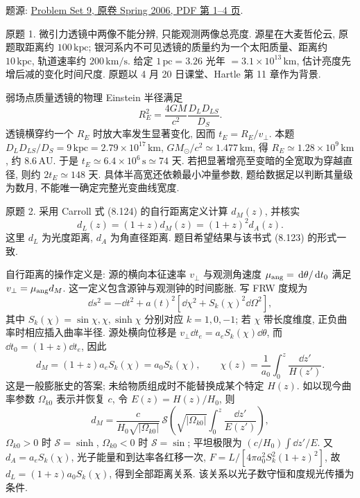 题源: \href{https://ocw.mit.edu/courses/8-962-general-relativity-spring-2020/resources/mit8_962s20_pset09/}{Problem Set 9, 原卷 Spring 2006, PDF 第 1--4 页}.

\begin{exercise}\label{ps:9.1}
原题 1. 微引力透镜中两像不能分辨, 只能观测两像总亮度. 源星在大麦哲伦云, 原题取距离约 $100\,\mathrm{kpc}$; 银河系内不可见透镜的质量约为一个太阳质量、距离约 $10\,\mathrm{kpc}$, 轨道速率约 $200\,\mathrm{km/s}$. 给定 $1\,\mathrm{pc}=3.26$ 光年 $=3.1\times10^{13}\,\mathrm{km}$, 估计亮度先增后减的变化时间尺度. 原题以 4 月 20 日课堂、Hartle 第 11 章作为背景.
\end{exercise}
\begin{solution}
弱场点质量透镜的物理 Einstein 半径满足
\[
R_E^2=\frac{4GM}{c^2}\frac{D_LD_{LS}}{D_S}.
\]
透镜横穿约一个 $R_E$ 时放大率发生显著变化, 因而 $t_E=R_E/v_\perp$. 本题 $D_LD_{LS}/D_S=9\,\mathrm{kpc}=2.79\times10^{17}\,\mathrm{km}$, $GM_\odot/c^2\simeq1.477\,\mathrm{km}$, 得 $R_E\simeq1.28\times10^9\,\mathrm{km}$, 约 $8.6\,\mathrm{AU}$. 于是 $t_E\simeq6.4\times10^6\,\mathrm{s}\simeq74$ 天. 若把显著增亮至变暗的全宽取为穿越直径, 则约 $2t_E\simeq148$ 天. 具体半高宽还依赖最小冲量参数, 题给数据足以判断其量级为数月, 不能唯一确定完整光变曲线宽度.
\end{solution}

\begin{exercise}\label{ps:9.2}
原题 2. 采用 Carroll 式 (8.124) 的自行距离定义计算 $d_M(z)$, 并核实
\[
d_L(z)=(1+z)d_M(z)=(1+z)^2d_A(z).
\]
这里 $d_L$ 为光度距离, $d_A$ 为角直径距离. 题目希望结果与该书式 (8.123) 的形式一致.
\end{exercise}
\begin{solution}
自行距离的操作定义是: 源的横向本征速率 $v_\perp$ 与观测角速度 $\mu_{\rm ang}=\,\mathrm d\theta/\,\mathrm d t_0$ 满足 $v_\perp=\mu_{\rm ang}d_M$. 这一定义包含源钟与观测钟的时间膨胀. 写 FRW 度规为
\[
\dd s^2=-\dd t^2+a(t)^2[\dd\chi^2+S_k(\chi)^2\dd\Omega^2],
\]
其中 $S_k(\chi)=\sin\chi,\chi,\sinh\chi$ 分别对应 $k=1,0,-1$; 若 $\chi$ 带长度维度, 正负曲率时相应插入曲率半径. 源处横向位移是 $v_\perp\dd t_e=a_eS_k(\chi)\dd\theta$, 而 $\dd t_0=(1+z)\dd t_e$, 因此
\[
d_M=(1+z)a_eS_k(\chi)=a_0S_k(\chi),\qquad
\chi(z)=\frac1{a_0}\int_0^z\frac{\dd z'}{H(z')}.
\]
这是一般膨胀史的答案; 未给物质组成时不能替换成某个特定 $H(z)$. 如以现今曲率参数 $\Omega_{k0}$ 表示并恢复 $c$, 令 $E(z)=H(z)/H_0$, 则
\[
d_M=\frac{c}{H_0\sqrt{|\Omega_{k0}|}}\,\mathcal{S}\!\left(\sqrt{|\Omega_{k0}|}\int_0^z\frac{\dd z'}{E(z')}\right),
\]
$\Omega_{k0}>0$ 时 $\mathcal S=\sinh$, $\Omega_{k0}<0$ 时 $\mathcal S=\sin$; 平坦极限为 $(c/H_0)\int\dd z'/E$. 又 $d_A=a_eS_k(\chi)$, 光子能量和到达率各红移一次, $F=L/[4\pi a_0^2S_k^2(1+z)^2]$, 故 $d_L=(1+z)a_0S_k(\chi)$, 得到全部距离关系. 该关系以光子数守恒和度规光传播为条件.
\end{solution}

